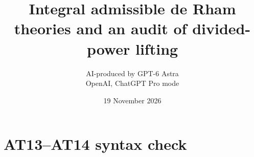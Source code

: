 \documentclass[11pt,a4paper]{article}
\title{Integral admissible de Rham theories and an audit of divided-power lifting}
\author{AI-produced by GPT-6 Astra\\OpenAI, ChatGPT Pro mode}
\date{19 November 2026}
\theoremstyle{definition}
\begin{document}
\section{AT13--AT14 syntax check}

\end{document}
